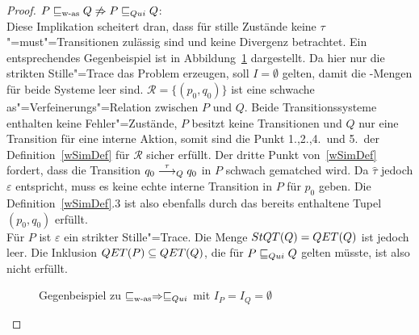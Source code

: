 \begin{proof}
  $P \sqsubseteq _{\mathrm{w}\text{-}\mathrm{as}} Q \not\Rightarrow P  \sqsubseteq  _{Qui} Q$:\\
  Diese Implikation scheitert dran, dass für stille Zustände keine
  $\tau$"=must"=Transitionen zulässig sind und \QRel{} keine Divergenz
  betrachtet. Ein entsprechendes Gegenbeispiel ist in
  Abbildung~\ref{QuiWasGegenBsp} dargestellt. Da hier nur die strikten
  Stille"=Trace das Problem erzeugen, soll $I = \emptyset$ gelten, damit die
  \MIT{}-Mengen für beide Systeme leer sind. $\mathcal{R} = \{(p_0,q_0)\}$ ist
  eine schwache as"=Verfeinerungs"=Relation zwischen $P$ und $Q$. Beide
  Transitionssysteme enthalten keine Fehler"=Zustände, $P$ besitzt keine
  Transitionen und $Q$ nur eine Transition für eine interne Aktion, somit sind
  die Punkt 1.,2.,4.\ und 5.\ der Definition~\ref{wSimDef} für $\mathcal{R}$
  sicher erfüllt. Der dritte Punkt von~\ref{wSimDef} fordert, dass die
  Transition $q_0 \must[\tau]_Q q_0$ in $P$ schwach gematched wird. Da
  $\hat{\tau}$ jedoch $\varepsilon$ entspricht, muss es keine echte interne
  Transition in $P$ für $p_0$ geben. Die Definition~\ref{wSimDef}.3 ist also
  ebenfalls durch das bereits enthaltene Tupel $(p_0,q_0)$ erfüllt.\\
  Für $P$ ist $\varepsilon$ ein strikter Stille"=Trace. Die Menge $StQT (Q) =
  QET (Q)$ ist jedoch leer. Die Inklusion $QET (P) \subseteq QET (Q)$, die
  für $P \sqsubseteq  _{Qui} Q$ gelten müsste, ist also nicht erfüllt.

  \begin{figure}[htbp]
    \begin{center}
      \caption{Gegenbeispiel zu $\sqsubseteq _{\mathrm{w}\text{-}\mathrm{as}} \Rightarrow  \sqsubseteq  _{Qui}$ mit $I_P = I_Q =
      \emptyset$}
      \label{QuiWasGegenBsp}
    \end{center}
  \end{figure}


\end{proof}
